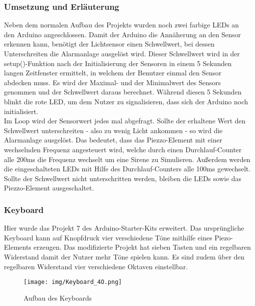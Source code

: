 \subsubsection{Umsetzung und Erläuterung}
Neben dem normalen Aufbau des Projekts wurden noch zwei farbige LEDs an den Arduino angeschlossen.
Damit der Arduino die Annäherung an den Sensor erkennen kann, benötigt der Lichtsensor einen Schwellwert, bei dessen Unterschreiten die Alarmanlage ausgelöst wird. Dieser Schwellwert wird in der setup()-Funktion nach der Initialisierung der Sensoren in einem 5 Sekunden langen Zeitfenster ermittelt, in welchem der Benutzer einmal den Sensor abdecken muss. Es wird der Maximal- und der Minimalwert des Sensors genommen und der Schwellwert daraus berechnet. Während diesen 5 Sekunden blinkt die rote LED, um dem Nutzer zu signalisieren, dass sich der Arduino noch initialisiert.\\
Im Loop wird der Sensorwert jedes mal abgefragt. Sollte der erhaltene Wert den Schwellwert unterschreiten - also zu wenig Licht ankommen - so wird die Alarmanlage ausgelöst. Das bedeutet, dass das Piezzo-Element mit einer wechselnden Frequenz angesteuert wird, welche durch einen Durchlauf-Counter alle 200ms die Frequenz wechselt um eine Sirene zu Simulieren. Außerdem werden die eingeschalteten LEDs mit Hilfe des Durchlauf-Counters alle 100ms gewechselt.
Sollte der Schwellwert nicht unterschritten werden, bleiben die LEDs sowie das Piezzo-Element ausgeschaltet.

\subsubsection{Keyboard}
Hier wurde das Projekt 7 des Arduino-Starter-Kits erweitert. Das ursprüngliche Keyboard kann auf Knopfdruck vier verschiedene Töne mithilfe eines Piezo-Elements erzeugen. Das modifizierte Projekt hat sieben Tasten und ein regelbaren Widerstand
damit der Nutzer mehr Töne spielen kann. Es sind zudem über den regelbaren Widerstand vier verschiedene Oktaven einstellbar.

\begin{figure}[h]
\begin{center}
\texttt{[image: img/Keyboard\_4O.png]}
\caption{Aufbau des Keyboards}
\label{kb_aufbau}
\end{center}
\end{figure}

